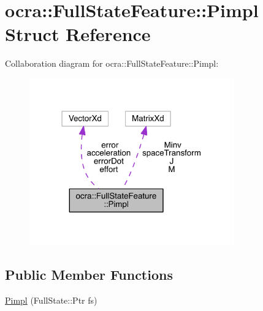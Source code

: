 \hypertarget{structocra_1_1FullStateFeature_1_1Pimpl}{}\section{ocra\+:\+:Full\+State\+Feature\+:\+:Pimpl Struct Reference}
\label{structocra_1_1FullStateFeature_1_1Pimpl}


Collaboration diagram for ocra\+:\+:Full\+State\+Feature\+:\+:Pimpl\+:\nopagebreak
\begin{figure}[H]
\begin{center}
\leavevmode
\includegraphics[width=250pt]{dc/d7c/structocra_1_1FullStateFeature_1_1Pimpl__coll__graph}
\end{center}
\end{figure}
\subsection*{Public Member Functions}
\begin{DoxyCompactItemize}
\item 
\hyperlink{structocra_1_1FullStateFeature_1_1Pimpl_a535c4bad2a46c4c31f3b6aa052564b16}{Pimpl} (Full\+State\+::\+Ptr fs)
\end{DoxyCompactItemize}
